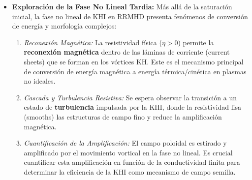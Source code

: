 \begin{itemize}
    \item \textbf{Exploración de la Fase No Lineal Tardia:} Más allá de la saturación inicial, la fase no lineal de KHI en RRMHD presenta fenómenos de conversión de energía y morfología complejos:
    \begin{enumerate}
        \item \textit{Reconexión Magnética:} La resistividad física ($\eta > 0$) permite la \textbf{reconexión magnética} dentro de las láminas de corriente (current sheets) que se forman en los vórtices KH. Este es el mecanismo principal de conversión de energía magnética a energía térmica/cinética en plasmas no ideales.
        \item \textit{Cascada y Turbulencia Resistiva:} Se espera observar la transición a un estado de \textbf{turbulencia} impulsada por la KHI, donde la resistividad lisa (smooths) las estructuras de campo fino y reduce la amplificación magnética.
        \item \textit{Cuantificación de la Amplificación:} El campo poloidal es estirado y amplificado por el movimiento vortical en la fase no lineal. Es crucial cuantificar esta amplificación en función de la conductividad finita para determinar la eficiencia de la KHI como mecanismo de campo semilla.
    \end{enumerate}
\end{itemize}
